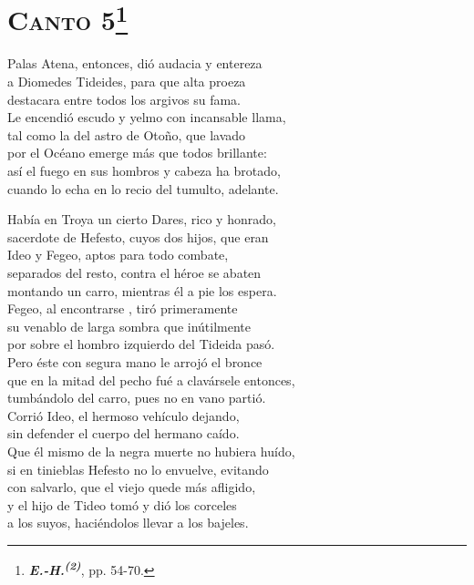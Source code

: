 \documentclass[11pt,twoside]{article}
\newcommand{\ehdos}{\emph{\textbf{E.-H.\textsuperscript{(2)}}}}
\begin{document}
\section*{\centering\textbf{\textsc{Canto} 5}\footnote{\ehdos, pp. 54-70.}}
%
\beginnumbering
\pstart
{}
Palas Atena, entonces, dió audacia y entereza\\
a Diomedes Tideides, para que alta proeza\\
destacara entre todos los argivos su fama.\\
Le encendió escudo y yelmo con incansable llama,\\
tal como la del astro de Otoño, que lavado\\
por el Océano emerge más que todos brillante:\\
así el fuego en sus hombros y cabeza ha brotado,\\
cuando lo echa en lo recio del tumulto, adelante.\par
Había en Troya un cierto Dares, rico y honrado,\\
sacerdote de Hefesto, cuyos dos hijos, que eran\\
Ideo y Fegeo, aptos para todo combate,\\
separados del resto, contra el héroe se abaten\\
montando un carro, mientras él a pie los espera.\\
Fegeo, al encontrarse , tiró primeramente\\
su venablo de larga sombra que inútilmente\\
por sobre el hombro izquierdo del Tideida pasó.\\
Pero éste con segura mano le arrojó el bronce\\
que en la mitad del pecho fué a clavársele entonces,\\
tumbándolo del carro, pues no en vano partió.\\
Corrió Ideo, el hermoso vehículo dejando,\\
sin defender el cuerpo del hermano caído.\\
Que él mismo de la negra muerte no hubiera huído,\\
si en tinieblas Hefesto no lo envuelve, evitando\\
con salvarlo, que el viejo quede más afligido,\\
y el hijo de Tideo tomó y dió los corceles\\
a los suyos, haciéndolos llevar a los bajeles.\\
\end{document}
